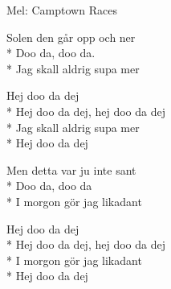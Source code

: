 \begin{SongText}[Solen]
    \begin{SongInfo}
        Mel: Camptown Races
    \end{SongInfo}
    \begin{SongVerse}
        Solen den går opp och ner\\*%
        Doo da, doo da.\\*%
        Jag skall aldrig supa mer
    \end{SongVerse}
    \begin{SongVerse}
        Hej doo da dej\\*%
        Hej doo da dej, hej doo da dej\\*%
        Jag skall aldrig supa mer\\*%
        Hej doo da dej
    \end{SongVerse}
    \begin{SongVerse}
        Men detta var ju inte sant\\*%
        Doo da, doo da\\*%
        I morgon gör jag likadant
    \end{SongVerse}
    \begin{SongVerse}
        Hej doo da dej\\*%
        Hej doo da dej, hej doo da dej\\*%
        I morgon gör jag likadant\\*%
        Hej doo da dej
    \end{SongVerse}
\end{SongText}
